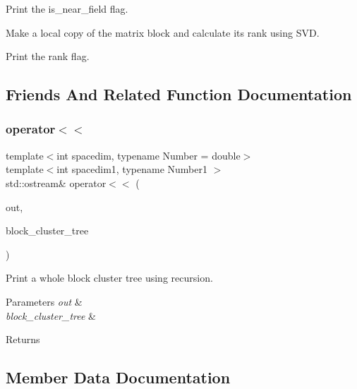 Print the {\ttfamily is\+\_\+near\+\_\+field} flag.

Make a local copy of the matrix block and calculate its rank using S\+VD.

Print the {\ttfamily rank} flag.

\subsection{Friends And Related Function Documentation}
\mbox{\label{classBlockClusterTree_a6ead7d49add78a2462eb039f00bf7f6a}} 
\subsubsection{\texorpdfstring{operator$<$$<$}{operator<<}}
{\footnotesize\ttfamily template$<$int spacedim, typename Number = double$>$ \\
template$<$int spacedim1, typename Number1 $>$ \\
std\+::ostream\& operator$<$$<$ (\begin{DoxyParamCaption}\item[{std\+::ostream \&}]{out,  }\item[{const \hyperlink{classBlockClusterTree}{Block\+Cluster\+Tree}$<$ spacedim1, Number1 $>$ \&}]{block\+\_\+cluster\+\_\+tree }\end{DoxyParamCaption})\hspace{0.3cm}{\ttfamily [friend]}}

Print a whole block cluster tree using recursion. 
\begin{DoxyParams}{Parameters}
{\em out} & \\
\hline
{\em block\+\_\+cluster\+\_\+tree} & \\
\hline
\end{DoxyParams}
\begin{DoxyReturn}{Returns}

\end{DoxyReturn}


\subsection{Member Data Documentation}
\mbox{\label{classBlockClusterTree_a000c439b578bcf4fa28b7f3edd6079e9}} 
